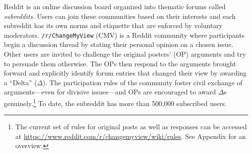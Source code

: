 Reddit is an online discussion board organized into thematic forums called \textit{subreddits}. Users can join these communities based on their interests and each subreddit has its own norms and etiquette that are enforced by voluntary moderators. \texttt{/r/ChangeMyView} (CMV) is a Reddit community where participants begin a discussion thread by stating their personal opinion on a chosen issue. Other users are invited to challenge the original posters' (OP) arguments and try to persuade them otherwise. The OPs then respond to the arguments brought forward and explicitly identify forum entries that changed their view by awarding a ``Delta'' ($\Delta$). The participation rules of the community foster civil exchange of arguments---even for divisive issues---and OPs are encouraged to award \(\Delta\)s genuinely.\footnote{The current set of rules for original posts as well as responses can be accessed at \url{https://www.reddit.com/r/changemyview/wiki/rules}. See Appendix for an overview.} To date, the subreddit has more than 500,000 subscribed users.





